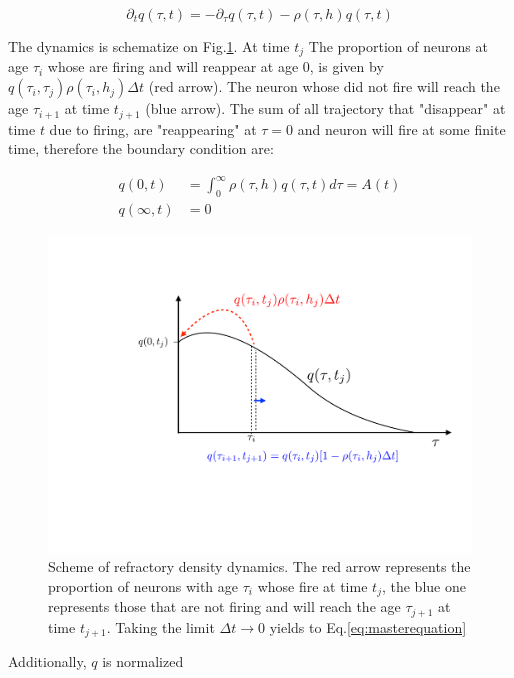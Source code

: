 \documentclass[12pt,twoside]{report}
\begin{document}
\begin{equation}
\label{eq:masterequation}
\partial_t q(\tau,t)=-\partial_\tau q(\tau,t)-\rho(\tau,h)q(\tau,t)
\end{equation}



The dynamics is schematize on Fig.\ref{fig:qtau}. At time $t_j$ The proportion of neurons at age $\tau_i$ whose are firing and will reappear at age $0$, is given by $q(\tau_i,\tau_j)\rho(\tau_i,h_j)\Delta t$ (red arrow). The neuron whose did not fire will reach the age $\tau_{i+1}$ at time $t_{j+1}$ (blue arrow). The sum of all trajectory that "disappear" at time $t$ due to firing, are "reappearing" at $\tau=0$ and neuron will fire at some finite time, therefore the boundary condition are:

\begin{align}
\label{eq:boundarycondition}
q(0,t)&=\int_{0}^{\infty}\rho(\tau,h)q(\tau,t)d\tau=A(t) \\
q(\infty,t)&=0
\end{align}

\begin{figure}[h!]
	\centering
	\includegraphics[width=0.7\linewidth]{qtau.pdf}
	\caption{Scheme of refractory density dynamics. The red arrow represents the proportion of neurons with age $\tau_i$ whose fire at time $t_j$, the blue one represents those that are not firing and will reach the age $\tau_{j+1}$ at time $t_{j+1}$. Taking the limit $\Delta t \rightarrow 0$ yields to Eq.\eqref{eq:masterequation}
	}
	\label{fig:qtau}
\end{figure}

Additionally, $q$ is normalized
\end{document}
